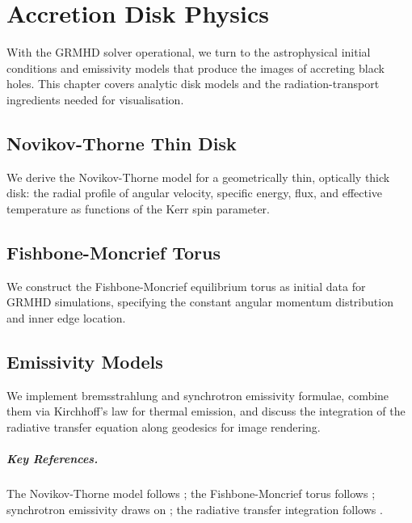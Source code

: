 \chapter{Accretion Disk Physics}
\label{ch:accretion}

With the GRMHD solver operational, we turn to the astrophysical initial
conditions and emissivity models that produce the images of accreting black
holes. This chapter covers analytic disk models and the radiation-transport
ingredients needed for visualisation.

\section{Novikov-Thorne Thin Disk}
\label{sec:acc-novikov-thorne}

We derive the Novikov-Thorne model for a geometrically thin, optically thick
disk: the radial profile of angular velocity, specific energy, flux, and
effective temperature as functions of the Kerr spin parameter.

\section{Fishbone-Moncrief Torus}
\label{sec:acc-torus}

We construct the Fishbone-Moncrief equilibrium torus as initial data for
GRMHD simulations, specifying the constant angular momentum distribution and
inner edge location.

\section{Emissivity Models}
\label{sec:acc-emissivity}

We implement bremsstrahlung and synchrotron emissivity formulae, combine them
via Kirchhoff's law for thermal emission, and discuss the integration of the
radiative transfer equation along geodesics for image rendering.

\paragraph{Key References.}
The Novikov-Thorne model follows \cite{Novikov1973,Page1974}; the
Fishbone-Moncrief torus follows \cite{Fishbone1976}; synchrotron emissivity
draws on \cite{Leung2011}; the radiative transfer integration follows
\cite{Dexter2009}.
